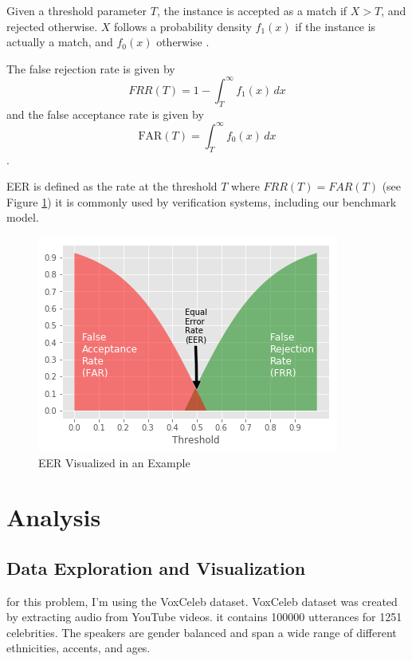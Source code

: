 \documentclass{article}
\begin{document}
Given a threshold parameter $T$, the instance is accepted as a match if $X>T$, and rejected otherwise.
$X$ follows a probability density $f_1(x)$
if the instance is actually a match, and $f_0(x)$ otherwise \cite{wiki:xxx}.

The false rejection rate is given by 
\begin{equation}
FRR(T) = 1- \int_{T}^\infty f_1(x) \, dx
\end{equation}
and the false acceptance rate is given by 
\begin{equation}
\mbox{FAR}(T)= \int_{T}^\infty f_0(x) \, dx 
\end{equation}. 

EER is defined as the rate at the threshold $T$ where $FRR(T) = FAR(T)$ (see Figure \ref{fig:EER})
it is commonly used by verification systems, including our benchmark model.

\begin{figure}
    \centering
    \includegraphics[scale=.75]{images/eer.png}
    \caption{EER Visualized in an Example}
    \label{fig:EER}
\end{figure}

\section{Analysis}

\subsection{Data Exploration and Visualization}

for this problem, I'm using the VoxCeleb dataset\cite{Nagrani17}.
VoxCeleb dataset was created by extracting audio from YouTube videos.
it contains 100000 utterances for 1251 celebrities. The speakers are gender balanced and span a wide range of different ethnicities, accents, and ages.
\end{document}
